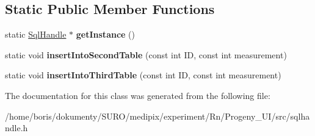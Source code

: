 \subsection*{Static Public Member Functions}
\begin{DoxyCompactItemize}
\item 
\hypertarget{classSqlHandle_a508226e88c14ca5d276cc767f6572b71}{static \hyperlink{classSqlHandle}{Sql\-Handle} $\ast$ {\bfseries get\-Instance} ()}\label{classSqlHandle_a508226e88c14ca5d276cc767f6572b71}

\item 
\hypertarget{classSqlHandle_a15e01a13e792ddd03ecfe81f0b19b002}{static void {\bfseries insert\-Into\-Second\-Table} (const int I\-D, const int measurement)}\label{classSqlHandle_a15e01a13e792ddd03ecfe81f0b19b002}

\item 
\hypertarget{classSqlHandle_ada1895a0832932054445a2548a44b5f8}{static void {\bfseries insert\-Into\-Third\-Table} (const int I\-D, const int measurement)}\label{classSqlHandle_ada1895a0832932054445a2548a44b5f8}

\end{DoxyCompactItemize}


The documentation for this class was generated from the following file\-:\begin{DoxyCompactItemize}
\item 
/home/boris/dokumenty/\-S\-U\-R\-O/medipix/experiment/\-Rn/\-Progeny\-\_\-\-U\-I/src/sqlhandle.\-h\end{DoxyCompactItemize}
